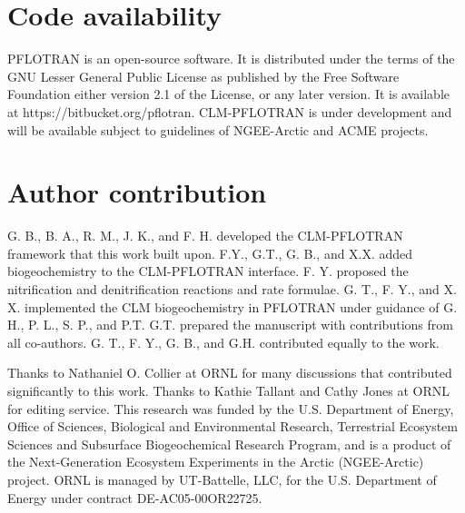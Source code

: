 \documentclass[gmd, manuscript]{copernicus}
\begin{document}
%
\section{Code availability}
PFLOTRAN is an open-source software. It is distributed under the terms of the
GNU Lesser General Public License as published by the Free Software Foundation
either version 2.1 of the License, or any later version. It is available at
https://bitbucket.org/pflotran. 
CLM-PFLOTRAN is under development and will be available subject to guidelines of NGEE-Arctic and ACME projects.

\section{Author contribution}
G. B., B. A., R. M., J. K., and F. H. developed the CLM-PFLOTRAN framework that this
work built upon. F.Y., G.T., G. B., and X.X. added biogeochemistry to the CLM-PFLOTRAN
interface. F. Y. proposed the nitrification and denitrification reactions and
rate formulae. G. T., F. Y., and X. X. implemented the CLM
biogeochemistry in PFLOTRAN under guidance of G. H., P. L., S. P., and P.T.
G.T. prepared the manuscript with contributions from all co-authors. 
G. T., F. Y., G. B., and G.H. contributed equally to the work.  

\begin{acknowledgements}
Thanks to Nathaniel O. Collier at ORNL for many discussions that contributed
significantly to this work.
Thanks to Kathie Tallant and Cathy Jones at ORNL for editing service. This
research was funded by the U.S. Department of Energy, Office of Sciences,
Biological and Environmental Research, Terrestrial Ecosystem Sciences and
Subsurface Biogeochemical Research Program, and is a product of the
Next-Generation Ecosystem Experiments in the Arctic (NGEE-Arctic) project.
ORNL is managed by UT-Battelle, LLC, for the U.S. Department of Energy under
contract DE-AC05-00OR22725.
\end{acknowledgements}







\end{document}
